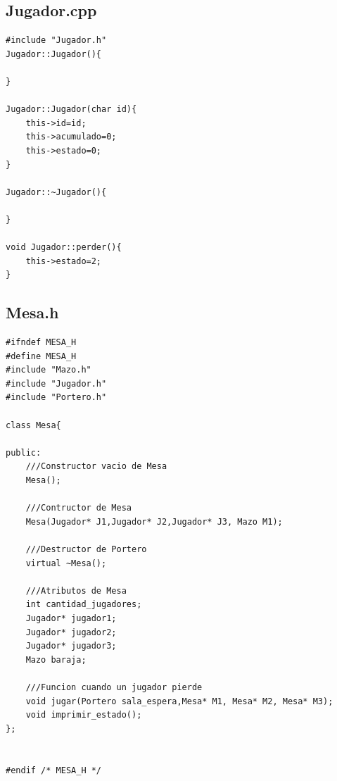 \documentclass[11pt]{article}
\begin{document}
\subsection{Jugador.cpp}
\begin{lstlisting}
#include "Jugador.h"
Jugador::Jugador(){

}

Jugador::Jugador(char id){
    this->id=id;
    this->acumulado=0;
    this->estado=0;
}

Jugador::~Jugador(){
    
}

void Jugador::perder(){
    this->estado=2;
}
\end{lstlisting}
\newpage

\subsection{Mesa.h}
\begin{lstlisting}
#ifndef MESA_H
#define MESA_H
#include "Mazo.h"
#include "Jugador.h"
#include "Portero.h" 

class Mesa{
    
public: 
    ///Constructor vacio de Mesa
    Mesa();
    
    ///Contructor de Mesa
    Mesa(Jugador* J1,Jugador* J2,Jugador* J3, Mazo M1);
        
    ///Destructor de Portero
    virtual ~Mesa();
    
    ///Atributos de Mesa
    int cantidad_jugadores;
    Jugador* jugador1;
    Jugador* jugador2;
    Jugador* jugador3;
    Mazo baraja;
    
    ///Funcion cuando un jugador pierde
    void jugar(Portero sala_espera,Mesa* M1, Mesa* M2, Mesa* M3);
    void imprimir_estado();
};


#endif /* MESA_H */
\end{lstlisting}
\newpage
\end{document}
